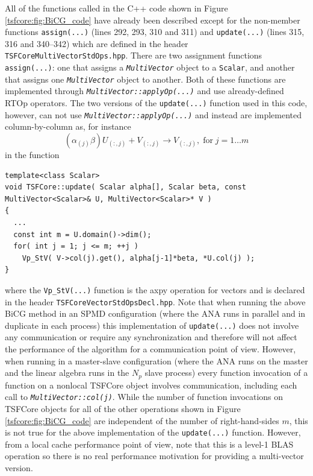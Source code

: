 %
All of the functions called in the C++ code shown in Figure
{}\ref{tsfcore:fig:BiCG_code} have already been described except for
the non-member functions {}\texttt{assign(...)} (lines 292, 293, 310
and 311) and {}\texttt{update(...)} (lines 315, 316 and 340--342)
which are defined in the header
{}\texttt{TSFCore\-Multi\-Vector\-Std\-Ops.hpp}.  There are two
assignment functions {}\texttt{assign(...)}: one that assigns a
{}\texttt{\textit{Multi\-Vector}} object to a {}\texttt{Scalar}, and
another that assigns one {}\texttt{\textit{Multi\-Vector}} object to
another.  Both of these functions are implemented through
{}\texttt{\textit{Multi\-Vector\-::applyOp(\-...)}} and use
already-defined RTOp operators.  The two versions of the
{}\texttt{update(...)} function used in this code, however, can not use
{}\texttt{\textit{Multi\-Vector\-::applyOp(\-...)}} and instead are
implemented column-by-column as, for instance
%
\[
(\alpha_{(j)} \beta) U_{(:,j)} + V_{(:,j)} \rightarrow V_{(:,j)}, \; \mbox{for} \; j = 1 \ldots m
\]
%
in the function

{\scriptsize\begin{verbatim}
template<class Scalar>
void TSFCore::update( Scalar alpha[], Scalar beta, const MultiVector<Scalar>& U, MultiVector<Scalar>* V )
{
  ...
  const int m = U.domain()->dim();
  for( int j = 1; j <= m; ++j )
    Vp_StV( V->col(j).get(), alpha[j-1]*beta, *U.col(j) );
}
\end{verbatim}}

{}\noindent{}where the {}\texttt{Vp\_StV(...)} function is the axpy
operation for vectors and is declared in the header
{}\texttt{TSFCore\-Vector\-StdOps\-Decl.hpp}.  Note that when running
the above BiCG method in an SPMD configuration (where the ANA runs in
parallel and in duplicate in each process) this implementation of
{}\texttt{update(...)} does not involve any communication or require
any synchronization and therefore will not affect the performance of
the algorithm for a communication point of view.  However, when
running in a master-slave configuration (where the ANA runs on the
master and the linear algebra runs in the $N_p$ slave process) every
function invocation of a function on a nonlocal TSFCore object involves
communication, including each call to
{}\texttt{\textit{Multi\-Vector\-::col(j)}}.  While the number of
function invocations on TSFCore objects for all of the other operations
shown in Figure {}\ref{tsfcore:fig:BiCG_code} are independent of the
number of right-hand-sides $m$, this is not true for the above
implementation of the {}\texttt{update(...)} function.  However, from
a local cache performance point of view, note that this is a level-1
BLAS operation so there is no real performance motivation for
providing a multi-vector version.

